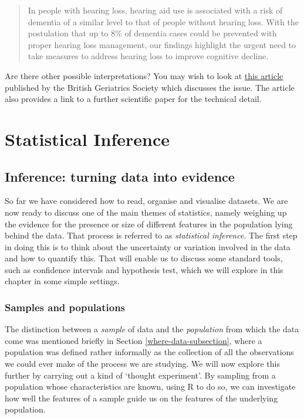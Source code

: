 \documentclass[
]{book}
\begin{document}
\begin{quote}
In people with hearing loss, hearing aid use is associated with a risk of dementia of a similar level to that of people without hearing loss. With the postulation that up to 8\% of dementia cases could be prevented with proper hearing loss management, our findings highlight the urgent need to take measures to address hearing loss to improve cognitive decline.
\end{quote}

Are there other possible interpretations? You may wish to look at \href{https://www.bgs.org.uk/blog/hearing-aid-use-reduces-dementia-or-is-it-dementia-reduces-hearing-aid-use-its-both}{this article} published by the British Geriatrics Society which discusses the issue. The article also provides a link to a further scientific paper for the technical detail.

\part{Statistical Inference}\label{part-statistical-inference}

\chapter{Inference: turning data into evidence}\label{inference}

So far we have considered how to read, organise and visualise datasets. We are now ready to discuss one of the main themes of statistics, namely weighing up the evidence for the presence or size of different features in the population lying behind the data. That process is referred to as \emph{statistical inference}. The first step in doing this is to think about the uncertainty or variation involved in the data and how to quantify this. That will enable us to discuss some standard tools, such as confidence intervals and hypothesis test, which we will explore in this chapter in some simple settings.

\section{Samples and populations}\label{samples-and-populations}

The distinction between a \emph{sample} of data and the \emph{population} from which the data come was mentioned briefly in Section \ref{where-data-subsection}, where a population was defined rather informally as the collection of all the observations we could ever make of the process we are studying. We will now explore this further by carrying out a kind of `thought experiment'. By sampling from a population whose characteristics are known, using R to do so, we can investigate how well the features of a sample guide us on the features of the underlying population.
\end{document}
